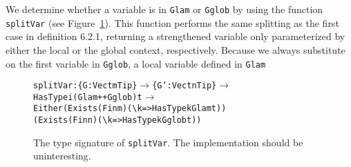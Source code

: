 We determine whether a variable is in \texttt{Glam} or \texttt{Gglob} by using the function \texttt{splitVar} (see Figure~\ref{fig:splitVar}). This function performs the same splitting as the first case in definition 6.2.1, returning a strengthened variable only parameterized by either the local or the global context, respectively. Because we always substitute on the first variable in \texttt{Gglob}, a local variable defined in \texttt{Glam} 

\begin{figure}
\begin{alltt}
splitVar : \{G: Vect m Tip\} \(\rightarrow\) \{G': Vect n Tip\} \(\rightarrow\) HasType i (Glam ++ Gglob) t \(\rightarrow\) 
           Either (Exists (Fin m) (\textbackslash{k} => HasType k Glam t)) 
                  (Exists (Fin n) (\textbackslash{k} => HasType k Gglob t))
\end{alltt}
\caption{The type signature of \texttt{splitVar}. The implementation should be uninteresting.}
\label{fig:splitVar}
\end{figure}




